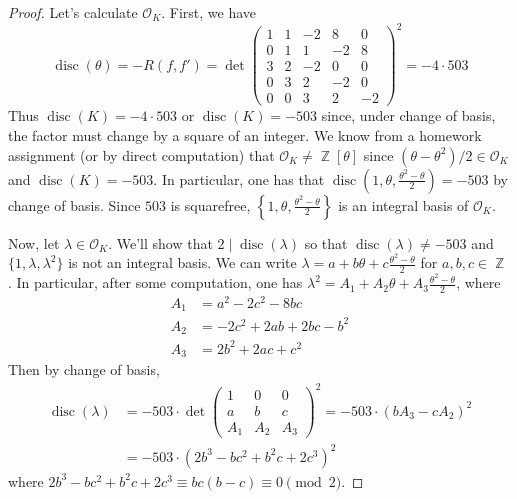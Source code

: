 \documentclass[11pt, a4paper]{memoir}
\DeclareMathOperator{\Z}{{\mathbb{Z}}}
\theoremstyle{change}
\theoremstyle{plain}
\theoremstyle{nonumberplain}
\newtheorem{proof}{Proof}
\DeclareMathOperator{\disc}{disc}
\numberwithin{equation}{section}
\begin{document}
\begin{proof}
    Let's calculate $\mathcal{O}_K$.
    First, we have
    \begin{equation*}
        \disc(\theta)=-R(f,f')=
        \det
        \begin{pmatrix}
            1&1&-2&8&0\\
            0&1&1&-2&8\\
            3&2&-2&0&0\\
            0&3&2&-2&0\\
            0&0&3&2&-2
        \end{pmatrix}^2
        =-4\cdot 503
    \end{equation*}
    Thus $\disc(K)=-4\cdot 503$ or $\disc(K)=-503$ since, under change of basis, the factor must change by a square of an integer.
    We know from a homework assignment (or by direct computation) that $\mathcal{O}_K\neq\Z[\theta]$ since $(\theta-\theta^2)/2\in\mathcal{O}_K$ and $\disc(K)=-503$.
    In particular, one has that $\disc(1,\theta,\frac{\theta^2-\theta}{2})=-503$ by change of basis.
    Since $503$ is squarefree, $\left\{1,\theta,\frac{\theta^2-\theta}{2}\right\}$ is an integral basis of $\mathcal{O}_K$.

    Now, let $\lambda\in\mathcal{O}_K$.
    We'll show that $2\mid\disc(\lambda)$ so that $\disc(\lambda)\neq -503$ and $\{1,\lambda,\lambda^2\}$ is not an integral basis.
    We can write $\lambda=a+b\theta+c\frac{\theta^2-\theta}{2}$ for $a,b,c\in\Z$.
    In particular, after some computation, one has $\lambda^2=A_1+A_2\theta+A_3\frac{\theta^2-\theta}{2}$, where
    \begin{align*}
        A_1&=a^2-2c^2-8bc\\
        A_2&=-2c^2+2ab+2bc-b^2\\
        A_3&= 2b^2+2ac+c^2
    \end{align*}
    Then by change of basis,
    \begin{align*}
        \disc(\lambda)&=-503\cdot\det
        \begin{pmatrix}
            1&0&0\\
            a&b&c\\
            A_1&A_2&A_3
        \end{pmatrix}^2
        = -503\cdot (bA_3-cA_2)^2\\
        &=-503\cdot(2b^3-bc^2+b^2c+2c^3)^2
    \end{align*}
    where $2b^3-bc^2+b^2c+2c^3\equiv bc(b-c)\equiv 0\pmod{2}$.
\end{proof}
\end{document}
